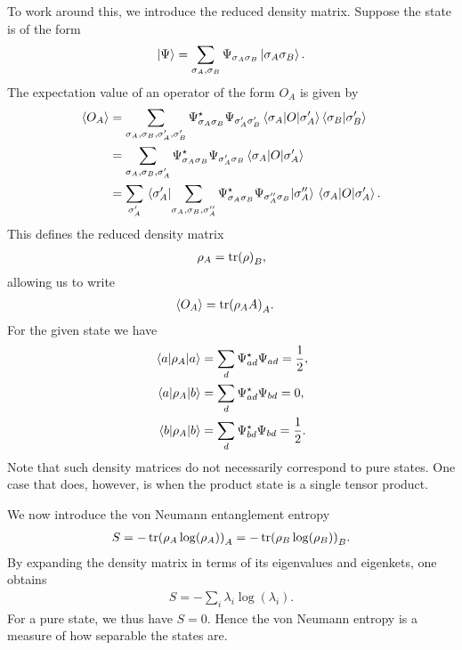 To work around this, we introduce the reduced density matrix. Suppose the state is of the form
\begin{align*}
	\ket{\Psi} = \sum\limits_{\sigma_{A}, \sigma_{B}}\Psi_{\sigma_{A}\sigma_{B}}\ket{\sigma_{A}\sigma_{B}}.
\end{align*}
The expectation value of an operator of the form $O_{A}$ is given by
\begin{align*}
	\expval{O_{A}} &= \sum\limits_{\sigma_{A}, \sigma_{B}, \sigma_{A}^{\prime}, \sigma_{B}^{\prime}}\Psi^{\star}_{\sigma_{A}\sigma_{B}}\Psi_{\sigma_{A}^{\prime}\sigma_{B}^{\prime}}\mel{\sigma_{A}}{O}{\sigma_{A}^{\prime}}\braket{\sigma_{B}}{\sigma_{B}^{\prime}} \\
	               &= \sum\limits_{\sigma_{A}, \sigma_{B}, \sigma_{A}^{\prime}}\Psi^{\star}_{\sigma_{A}\sigma_{B}}\Psi_{\sigma_{A}^{\prime}\sigma_{B}}\mel{\sigma_{A}}{O}{\sigma_{A}^{\prime}} \\
	               &= \sum\limits_{\sigma_{A}^{\prime}}\mel{\sigma_{A}^{\prime}}{\sum\limits_{\sigma_{A},\sigma_{B}, \sigma_{A}^{\prime\prime}}\Psi^{\star}_{\sigma_{A}\sigma_{B}}\Psi_{\sigma_{A}^{\prime\prime}\sigma_{B}}}{\sigma_{A}^{\prime\prime}}\mel{\sigma_{A}}{O}{\sigma_{A}^{\prime}}.
\end{align*}
This defines the reduced density matrix
\begin{align*}
	\rho_{A} = \tr(\rho)_{B},
\end{align*}
allowing us to write
\begin{align*}
	\expval{O_{A}} &= \tr(\rho_{A}A)_{A}.
\end{align*}
For the given state we have
\begin{align*}
	\mel{a}{\rho_{A}}{a} &= \sum\limits_{d}\Psi^{\star}_{ad}\Psi_{ad} = \frac{1}{2}, \\
	\mel{a}{\rho_{A}}{b} &= \sum\limits_{d}\Psi^{\star}_{ad}\Psi_{bd} = 0, \\
	\mel{b}{\rho_{A}}{b} &= \sum\limits_{d}\Psi^{\star}_{bd}\Psi_{bd} = \frac{1}{2}.
\end{align*}
Note that such density matrices do not necessarily correspond to pure states. One case that does, however, is when the product state is a single tensor product.

We now introduce the von Neumann entanglement entropy
\begin{align*}
	S = -\tr(\rho_{A}\log(\rho_{A}))_{A} = -\tr(\rho_{B}\log(\rho_{B}))_{B}.
\end{align*}
By expanding the density matrix in terms of its eigenvalues and eigenkets, one obtains
\begin{align*}
	S = -\sum\limits_{i}\lambda_{i}\log(\lambda_{i}).
\end{align*}
For a pure state, we thus have $S = 0$. Hence the von Neumann entropy is a measure of how separable the states are.

